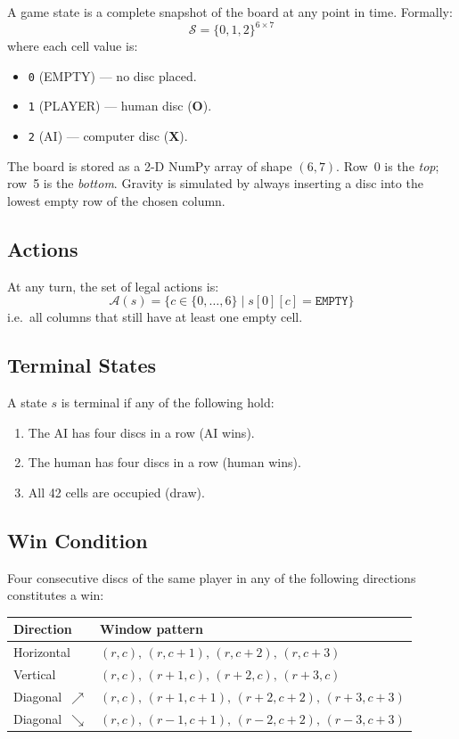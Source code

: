 \documentclass[12pt]{article}
\begin{document}
A game state is a complete snapshot of the board at any point in time.
Formally:
\[
    \mathcal{S} = \{0, 1, 2\}^{6 \times 7}
\]
where each cell value is:
\begin{itemize}
    \item \texttt{0} (EMPTY) --- no disc placed.
    \item \texttt{1} (PLAYER) --- human disc (\textbf{O}).
    \item \texttt{2} (AI) --- computer disc (\textbf{X}).
\end{itemize}

The board is stored as a 2-D NumPy array of shape $(6, 7)$.
Row~0 is the \emph{top}; row~5 is the \emph{bottom}.
Gravity is simulated by always inserting a disc into the lowest empty row of
the chosen column.

\subsection{Actions}

At any turn, the set of legal actions is:
\[
    \mathcal{A}(s) = \{ c \in \{0,\ldots,6\} \mid s[0][c] = \texttt{EMPTY} \}
\]
i.e.\ all columns that still have at least one empty cell.

\subsection{Terminal States}

A state $s$ is terminal if any of the following hold:
\begin{enumerate}
    \item The AI has four discs in a row (AI wins).
    \item The human has four discs in a row (human wins).
    \item All 42 cells are occupied (draw).
\end{enumerate}

\subsection{Win Condition}

Four consecutive discs of the same player in any of the following directions
constitutes a win:

\begin{center}
\begin{tabular}{@{} l l @{}}
\toprule
\textbf{Direction} & \textbf{Window pattern} \\
\midrule
Horizontal  & $(r,c),\,(r,c{+}1),\,(r,c{+}2),\,(r,c{+}3)$ \\
Vertical    & $(r,c),\,(r{+}1,c),\,(r{+}2,c),\,(r{+}3,c)$ \\
Diagonal~$\nearrow$ & $(r,c),\,(r{+}1,c{+}1),\,(r{+}2,c{+}2),\,(r{+}3,c{+}3)$ \\
Diagonal~$\searrow$ & $(r,c),\,(r{-}1,c{+}1),\,(r{-}2,c{+}2),\,(r{-}3,c{+}3)$ \\
\bottomrule
\end{tabular}
\end{center}
\end{document}

